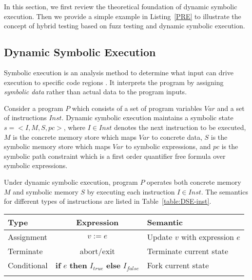 
In this section, we first review the theoretical foundation of dynamic
symbolic execution. Then we provide a simple example in
Listing~\ref{PRE} to illustrate the concept of hybrid testing based on
fuzz testing and dynamic symbolic execution.

\subsection{Dynamic Symbolic Execution}

Symbolic execution is an analysis method to determine what input can
drive execution to specific code regions \cite{King:Symbex}. It
interprets the program by assigning \textit{symbolic data} rather than
actual data to the program inputs.

Consider a program $P$ which consists of a set of program variables
$Var$ and a set of instructions $Inst$. Dynamic symbolic execution
maintains a symbolic state $s=<I,M,S,pc>$, where $I\in Inst$ denotes
the next instruction to be executed, $M$ is the concrete memory store
which maps $Var$ to concrete data, $S$ is the symbolic memory store
which maps $Var$ to symbolic expressions, and $pc$ is the symbolic path
constraint which is a first order quantifier free formula over symbolic
expressions.

Under dynamic symbolic execution, program $P$ operates both concrete
memory $M$ and symbolic memory $S$ by executing each instruction $I\in
Inst$. The semantics for different types of instructions are listed in
Table~\ref{table:DSE-inst}.

\begin{table}[!b]
{\begin{tabular*}{20pc}{@{\extracolsep{\fill}}lcl@{}}\toprule
Type  & Expression & Semantic\\
\midrule
Assignment   &  $v:=e$ & Update $v$ with expression $e$\\
Terminate    &  abort/exit & Terminate current state \\
Conditional  &  \textbf{if} $e$ \textbf{then} $I_{true}$ \textbf{else} $I_{false}$ & Fork current state\\
\botrule
\end{tabular*}}{}
\end{table}

